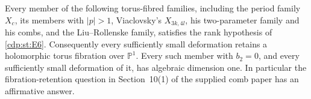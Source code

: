 \begin{proposition}\hypertarget{tag-01GW}{}\label{cdp:st:E7}

Every member of the following torus-fibred families,
including the period family $X_c$, its members with $|p|>1$,
Viaclovsky's $X_{3k,4l}$, his two-parameter family and his combs,
and the Liu--Rollenske family, satisfies the rank hypothesis of \ref{cdp:st:E6}.
Consequently every sufficiently small deformation retains a
holomorphic torus fibration over $\mathbb P^1$. Every such member
with $b_2=0$, and every sufficiently small deformation of it, has
algebraic dimension one. In particular the fibration-retention
question in Section~10(1) of the supplied comb paper has an
affirmative answer.
\end{proposition}


